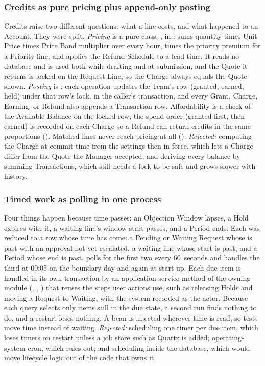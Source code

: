 \subsubsection{Credits as pure pricing plus append-only posting}

Credits raise two different questions: what a line costs, and what happened to an Account. They were split. \emph{Pricing} is a pure class, , in :  sums quantity times Unit Price times Price Band multiplier over every hour, times the priority premium for a Priority line, and  applies the Refund Schedule to a lead time. It reads no database and is used both while drafting and at submission, and the Quote it returns is locked on the Request Line, so the Charge always equals the Quote shown. \emph{Posting} is : each operation updates the Team's  row (granted, earned, held) under that row's lock, in the caller's transaction, and every Grant, Charge, Earning, or Refund also appends a Transaction row. Affordability is a check of the Available Balance on the locked row; the spend order (granted first, then earned) is recorded on each Charge so a Refund can return credits in the same proportions (). Matched lines never reach pricing at all (). \emph{Rejected:} computing the Charge at commit time from the settings then in force, which lets a Charge differ from the Quote the Manager accepted; and deriving every balance by summing Transactions, which still needs a lock to be safe and grows slower with history.

\subsubsection{Timed work as polling in one process}

Four things happen because time passes: an Objection Window lapses, a Hold expires with it, a waiting line's window start passes, and a Period ends. Each was reduced to a row whose time has come: a Pending or Waiting Request whose  is past with an approval not yet escalated, a waiting line whose start is past, and a Period whose end is past.  polls for the first two every 60~seconds and  handles the third at 00:05 on the boundary day and again at start-up. Each due item is handled in its own transaction by an application-service method of the owning module (, , ) that reuses the steps user actions use, such as releasing Holds and moving a Request to Waiting, with the system recorded as the actor. Because each query selects only items still in the due state, a second run finds nothing to do, and a restart loses nothing. A  bean is injected wherever time is read, so tests move time instead of waiting. \emph{Rejected:} scheduling one timer per due item, which loses timers on restart unless a job store such as Quartz is added; operating-system cron, which  rules out; and scheduling inside the database, which would move lifecycle logic out of the code that owns it.
